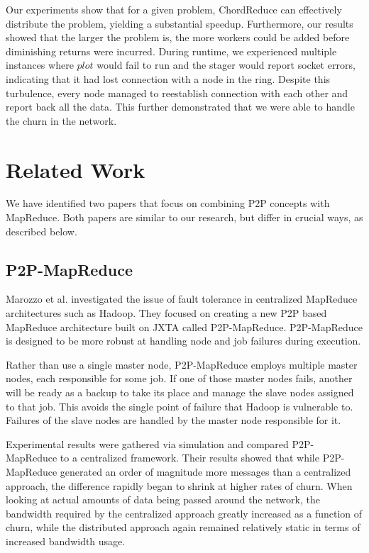 \documentclass[10pt, conference, compsocconf]{IEEEtran}
\begin{document}
Our experiments show that for a given problem, ChordReduce can effectively distribute the problem, yielding a substantial speedup.  Furthermore, our results showed that the larger the problem is, the more workers could be added before diminishing returns were incurred.  During runtime, we experienced multiple instances where $plot$ would fail to run and the stager would report socket errors, indicating that it had lost connection with a node in the ring.  Despite this turbulence, every node managed to reestablish connection with each other and report back all the data.  This further demonstrated that we were able to handle the churn in the network.



\section{Related Work}

We have identified two papers that focus on combining P2P concepts with MapReduce.  Both papers are similar to our research, but differ in crucial ways, as described below.


\subsection{P2P-MapReduce}
Marozzo et al. \cite{marozzo2012p2p} investigated the issue of fault tolerance in centralized MapReduce architectures such as Hadoop.  They focused on creating a new P2P based MapReduce architecture built on JXTA \cite{935182} called P2P-MapReduce.  P2P-MapReduce is designed to be more robust at handling node and job failures during execution.

Rather than use a single master node, P2P-MapReduce employs multiple master nodes, each responsible for some job.  If one of those master nodes fails, another will be ready as a backup to take its place and manage the slave nodes assigned to that job.  This avoids the single point of failure that Hadoop is vulnerable to. Failures of the slave nodes are handled by the master node responsible for it.

Experimental results were gathered via simulation and compared P2P-MapReduce to a centralized framework. Their results showed that while P2P-MapReduce generated an order of magnitude more messages than a centralized approach, the difference rapidly began to shrink at higher rates of churn.  When looking at actual amounts of data being passed around the network, the bandwidth required by the centralized approach greatly increased as a function of churn, while the distributed approach again remained relatively static in terms of increased bandwidth usage.  
\end{document}
